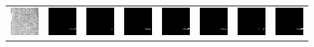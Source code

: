 \documentclass[sn-mathphys]{sn-jnl}%
\theoremstyle{thmstyleone}%
\theoremstyle{thmstyletwo}%
\theoremstyle{thmstylethree}%
\begin{document}
\begin{figure}
{\begin{tabular}{p{1.2cm}p{1.2cm}p{1.2cm}p{1.2cm}p{1.2cm}p{1.2cm}p{1.2cm}p{1.2cm}}
    \includegraphics[width=0.6in]{fig9-1-input.png}&
    \includegraphics[width=0.6in]{fig9-1-y.png}&
    \includegraphics[width=0.6in]{fig9-1-ori.png}&
    \includegraphics[width=0.6in]{fig9-1-cutmix.png}&
    \includegraphics[width=0.6in]{fig9-1-cutout.png}&
    \includegraphics[width=0.6in]{fig9-1-has.png}&
    \includegraphics[width=0.6in]{fig9-1-gridmask.png}&
    \includegraphics[width=0.6in]{fig9-1-ours.png}\\



\end{tabular}}
\end{figure}
\end{document}
